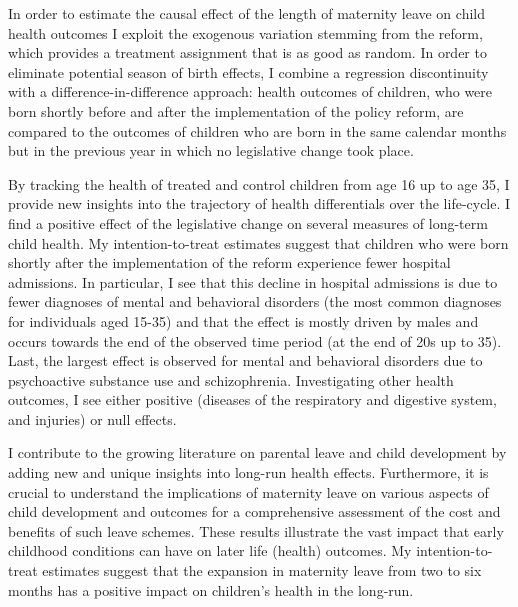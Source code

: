 \documentclass[11pt, a4paper,draft]{article} %
\begin{document}
In order to estimate the causal effect of the length of maternity leave on child health outcomes I exploit the exogenous variation stemming from the reform, which provides a treatment assignment that is as good as random. In order to eliminate potential season of birth effects, I combine a regression discontinuity with a difference-in-difference approach: health outcomes of children, who were born shortly before and after the implementation of the policy reform, are compared to the outcomes of children who are born in the same calendar months but in the previous year in which no legislative change took place.\newline

By tracking the health of treated and control children from age 16 up to age 35, I provide new insights into the trajectory of health differentials over the life-cycle.
I find a positive effect of the legislative change on several measures of long-term child health. My intention-to-treat estimates suggest that children who were born shortly after the implementation of the reform experience fewer hospital admissions.
In particular, I see that this decline in hospital admissions is due to fewer diagnoses of mental and behavioral disorders (the most common diagnoses for individuals aged 15-35) and that the effect is mostly driven by males and occurs towards the end of the observed time period (at the end of 20s up to 35). Last, the largest effect is observed for mental and behavioral disorders due to psychoactive substance use and schizophrenia. 
Investigating other health outcomes, I see either positive (diseases of the respiratory and digestive system, and injuries) or null effects. \newline



I contribute to the growing literature on parental leave and child development by adding new and unique insights into long-run health effects. Furthermore, it is crucial to understand the implications of maternity leave on various aspects of child development and outcomes for a comprehensive assessment of the cost and benefits of such leave schemes. These results illustrate the vast impact that early childhood conditions can have on later life (health) outcomes. My intention-to-treat estimates suggest that the expansion in maternity leave from two to six months has a positive impact on children’s health in the long-run.
\end{document}
